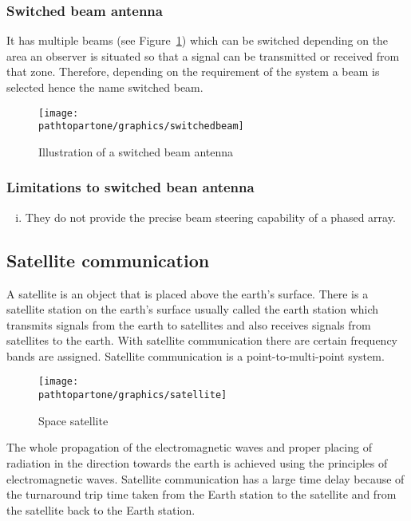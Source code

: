 \subsubsection{Switched beam antenna}
It has multiple beams (see Figure~\ref{fig:switchedbeam}) which can be switched depending on the area an observer is situated so that a signal can be transmitted or received from that zone. Therefore, depending on the requirement of the system a beam is selected hence the name switched beam.
\begin{figure}[h]
\centering
\texttt{[image: \\pathtopartone/graphics/switchedbeam]}
\caption{Illustration of a switched beam antenna}
\label{fig:switchedbeam}
\end{figure}

\subsubsection{Limitations to switched bean antenna}
\begin{enumerate}[(i)]
\item They do not provide the precise beam steering capability of a phased array.
\end{enumerate}

\subsection{Satellite communication}
A satellite is an object that is placed above the earth's surface. There is a satellite station on the earth's surface usually called the earth station which transmits signals from the earth to satellites and also receives signals from satellites to the earth. With satellite communication there are certain frequency bands are assigned. Satellite communication is a point-to-multi-point system.

\begin{figure}[h]
\centering
\texttt{[image: \\pathtopartone/graphics/satellite]}
\caption{Space satellite}
\end{figure}

The whole propagation of the electromagnetic waves and proper placing of radiation in the direction towards the earth is achieved using the principles of electromagnetic waves. Satellite communication has a large time delay because of the turnaround trip time taken from the Earth station to the satellite and from the satellite back to the Earth station.


